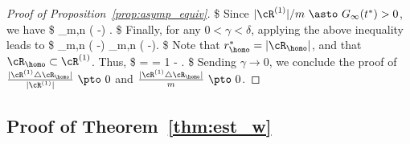 \begin{proof}[Proof of Proposition~\ref{prop:asymp_equiv}]
\$
Since $|\cR^{(1)}|/m~\asto~ G_\infty(t^*)>0$,
we have
\$
\limsup_{m,n\to \infty}
\PP\bigg(  -\delta  \bigg) \geq {}.
\$
Finally, for any $0<\gamma<\delta$, applying the above inequality leads to
\$
\limsup_{m,n\to \infty}
\PP\bigg(  -\delta  \bigg) \geq
\limsup_{m,n\to \infty}
\PP\bigg(  -\gamma \bigg)\geq {}.
\$
Note that $r_\homo^* = |\cR_\homo|$, and that $\cR_\homo\subset \cR^{(1)}$.
Thus,
\$
 = 
= 1 - .
\$
Sending $\gamma\to 0$, we conclude the proof of
$\frac{|\cR^{(1)}\bigtriangleup \cR_\homo|}{|\cR^{(1)}|}~\pto ~0$ and
$\frac{|\cR^{(1)}\bigtriangleup \cR_\homo|}{m}~\pto ~0$.
\end{proof}


\subsection{Proof of Theorem~\ref{thm:est_w}}
\label{app:thm_est_w}

